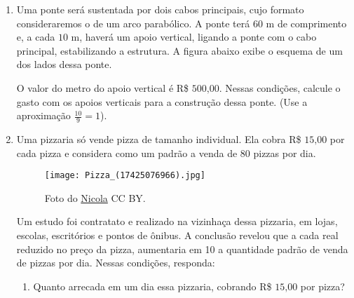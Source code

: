 {\begin{enumerate}
\item Uma ponte será sustentada por dois cabos principais,  cujo formato consideraremos o de um arco parabólico. A ponte terá \(60\) m de comprimento e, a cada \(10\) m, haverá um apoio vertical, ligando a ponte com o cabo principal, estabilizando a estrutura. A figura abaixo exibe o esquema de um dos lados dessa ponte.
\begin{center}\end{center}
O valor do metro do apoio vertical é R\$ \(500\text{,}00\). Nessas condições, calcule o gasto com os apoios verticais para a construção dessa ponte. (Use a aproximação \(\frac{10}{9} = 1\)).

\item Uma pizzaria só vende pizza de tamanho individual. Ela cobra R\$ \(15\text{,}00\) por cada pizza e considera como um padrão a venda de \(80\) pizzas por dia.

\begin{figure}[H]
\centering
\capstart

\noindent\texttt{[image: Pizza\_(17425076966).jpg]}
\caption{Foto do \href{https://commons.wikimedia.org/wiki/File:Pizza\_(17425076966).jpg}{Nicola} CC BY.}\label{\detokenize{AF209-E:id4}}\end{figure}
\needspace{5em}
Um estudo foi contratato e realizado na vizinhaça dessa pizzaria, em lojas, escolas, escritórios e pontos de ônibus. A conclusão revelou que a cada real reduzido no preço da pizza, aumentaria em 10 a quantidade padrão de venda de pizzas por dia. Nessas condições, responda:
\begin{enumerate}
\item {} 
Quanto arrecada em um dia essa pizzaria, cobrando R\$ \(15\text{,}00\) por pizza?


\end{enumerate}
\end{enumerate}}
